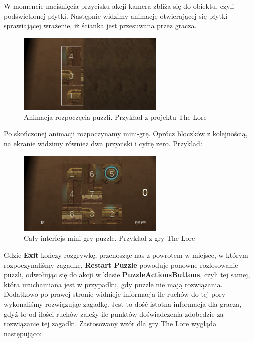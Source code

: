 \documentclass[oneside,polski,logo]{amuthesis}
\begin{document}
W momencie naciśnięcia przycisku akcji kamera zbliża się do obiektu, czyli podświetlonej płytki. Następnie widzimy animację otwierającej się płytki sprawiającej wrażenie, iż ścianka jest przesuwana przez gracza.
\begin{figure}[h]
	\centering
	\includegraphics[width=7cm]{images/tyrek/otwieraniePuzzli.png}
	\caption{Animacja rozpoczęcia puzzli. Przykład z projektu The Lore}
\end{figure}

Po skończonej animacji rozpoczynamy mini-grę. Oprócz bloczków z kolejnością, na ekranie widzimy również dwa przyciski i cyfrę zero. Przyklad:
\begin{figure}[h]
	\centering
	\includegraphics[width=7cm]{images/tyrek/puzzlebuttons.png}
	\caption{Cały interfejs mini-gry puzzle. Przykład z gry The Lore}
\end{figure}
Gdzie \textbf{Exit} kończy rozgrywkę, przenosząc nas z powrotem w miejsce, w którym rozpoczynaliśmy zagadkę, \textbf{Restart Puzzle} powoduje ponowne rozlosowanie puzzli, odwołując się do akcji w klasie \textbf{PuzzleActionsButtons}, czyli tej samej, która uruchamiana jest w przypadku, gdy puzzle nie mają rozwiązania. Dodatkowo po prawej stronie widnieje informacja ile ruchów do tej pory wykonaliśmy rozwiązując zagadkę. Jest to dość istotna informacja dla gracza, gdyż to od ilości ruchów zależy ile punktów doświadczenia zdobędzie za rozwiązanie tej zagadki. Zastosowany wzór dla gry The Lore wygląda następująco:
\end{document}
